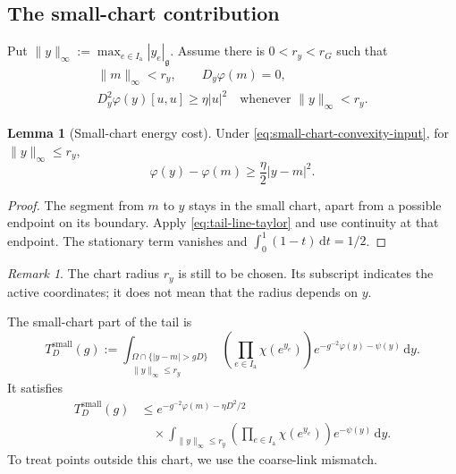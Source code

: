 \documentclass[10pt,reqno]{amsart}
\theoremstyle{definition}
\newtheorem{lemma}[definition]{Lemma}
\theoremstyle{remark}
\newtheorem{remark}[definition]{Remark}
\numberwithin{equation}{section}
\numberwithin{figure}{section}
\newcommand{\g}{\mathfrak g}
\newcommand{\dd}{\mathrm d}
\newcommand{\Ia}{I_{\mathrm a}}
\begin{document}
\subsection{The small-chart contribution}
Put $\|y\|_\infty:=\max_{e\in\Ia}|y_e|_\g$.
Assume there is $0<r_y<r_G$ such that
\begin{equation}\label{eq:small-chart-convexity-input}
\begin{gathered}
\|m\|_\infty<r_y,\qquad D_y\varphi(m)=0,\\
D_y^2\varphi(y)[u,u]\ge\eta|u|^2
\quad\text{whenever }\|y\|_\infty<r_y.
\end{gathered}
\end{equation}
\begin{lemma}[Small-chart energy cost]\label{lem:small-chart-cost}
Under \eqref{eq:small-chart-convexity-input}, for $\|y\|_\infty\le r_y$,
\begin{equation}\label{eq:small-chart-energy-cost}
\varphi(y)-\varphi(m)\ge\frac\eta2|y-m|^2.
\end{equation}
\end{lemma}
\begin{proof}
The segment from $m$ to $y$ stays in the small chart, apart from a possible
endpoint on its boundary. Apply \eqref{eq:tail-line-taylor} and use continuity
at that endpoint. The stationary term vanishes and
$\int_0^1(1-t)\,\dd t=1/2$.
\end{proof}
\begin{remark}
The chart radius $r_y$ is still to be chosen. Its subscript indicates the
active coordinates; it does not mean that the radius depends on $y$.
\end{remark}
The small-chart part of the tail is
\begin{equation}\label{eq:small-chart-tail-definition}
T_D^{\mathrm{small}}(g):=
\int_{\substack{\Omega\cap\{|y-m|>gD\}\\\|y\|_\infty\le r_y}}
\left(\prod_{e\in\Ia}\chi(e^{y_e})\right)
e^{-g^{-2}\varphi(y)-\psi(y)}\,\dd y.
\end{equation}
It satisfies
\begin{equation}\label{eq:small-chart-tail-bound}
\boxed{
\begin{aligned}
T_D^{\mathrm{small}}(g)
&\le e^{-g^{-2}\varphi(m)-\eta D^2/2}\\
&\quad\times\int_{\|y\|_\infty\le r_y}
\left(\prod_{e\in\Ia}\chi(e^{y_e})\right)e^{-\psi(y)}\,\dd y.
\end{aligned}}
\end{equation}
To treat points outside this chart, we use the coarse-link mismatch.
\end{document}
